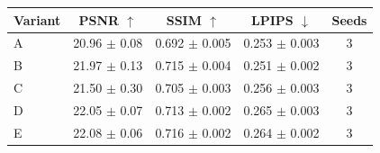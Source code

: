 \begin{tabular}{lcccc}
\toprule
Variant & PSNR $\uparrow$ & SSIM $\uparrow$ & LPIPS $\downarrow$ & Seeds \\
\midrule
A & 20.96 $\pm$ 0.08 & 0.692 $\pm$ 0.005 & 0.253 $\pm$ 0.003 & 3 \\
B & 21.97 $\pm$ 0.13 & 0.715 $\pm$ 0.004 & 0.251 $\pm$ 0.002 & 3 \\
C & 21.50 $\pm$ 0.30 & 0.705 $\pm$ 0.003 & 0.256 $\pm$ 0.003 & 3 \\
D & 22.05 $\pm$ 0.07 & 0.713 $\pm$ 0.002 & 0.265 $\pm$ 0.003 & 3 \\
E & 22.08 $\pm$ 0.06 & 0.716 $\pm$ 0.002 & 0.264 $\pm$ 0.002 & 3 \\
\bottomrule
\end{tabular}
